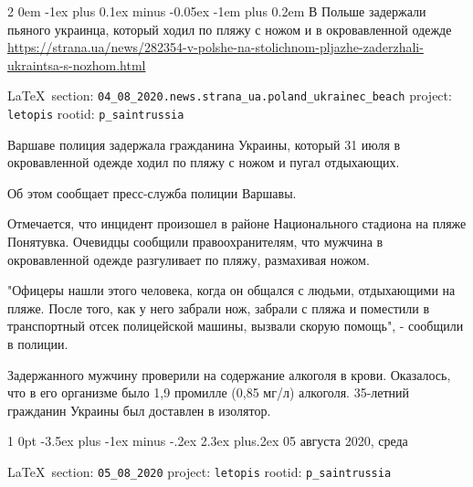 \documentclass[a4paper,11pt]{extreport}
\makeatletter
\renewcommand\section{%
  \clearpage
  \@startsection{section}%
    {1}%
    {0pt}%
    {-3.5ex plus -1ex minus -.2ex}%
    {2.3ex plus.2ex}%
    {\centering\normalfont\Huge\bfseries}%
}
\renewcommand\subsection{%
  \clearpage
    \@startsection{subsection}%
    {2}%
    {0em}%
    {-1ex plus 0.1ex minus -0.05ex}%
    {-1em plus 0.2em}%
    {\scshape\bfseries\Large}%
}
\makeatother
\begin{document}
 
\subsection{В Польше задержали пьяного украинца, который ходил по пляжу с ножом и в окровавленной одежде}
\label{sec:04_08_2020.news.strana_ua.poland_ukrainec_beach}
\url{https://strana.ua/news/282354-v-polshe-na-stolichnom-pljazhe-zaderzhali-ukraintsa-s-nozhom.html}
  
\vspace{0.5cm}
 {\ifDEBUG\small\LaTeX~section: \verb|04_08_2020.news.strana_ua.poland_ukrainec_beach| project: \verb|letopis| rootid: \verb|p_saintrussia| \fi}
\vspace{0.5cm}

Варшаве полиция задержала гражданина Украины, который 31 июля в окровавленной
одежде ходил по пляжу с ножом и пугал отдыхающих. 

Об этом сообщает пресс-служба полиции Варшавы.

Отмечается, что инцидент произошел в районе Национального стадиона на пляже
Понятувка. Очевидцы сообщили правоохранителям, что мужчина в окровавленной
одежде разгуливает по пляжу, размахивая ножом.

"Офицеры нашли этого человека, когда он общался с людьми, отдыхающими на пляже.
После того, как у него забрали нож, забрали с пляжа и поместили в транспортный
отсек полицейской машины, вызвали скорую помощь", - сообщили в полиции.

Задержанного мужчину проверили на содержание алкоголя в крови. Оказалось, что в
его организме было 1,9 промилле (0,85 мг/л) алкоголя. 35-летний гражданин
Украины был доставлен в изолятор.
  
 
 
\section{05 августа 2020, среда}
\label{sec:05_08_2020}
  
{\ifDEBUG\fi\small\LaTeX~section: \verb|05_08_2020| project: \verb|letopis| rootid: \verb|p_saintrussia|}
\end{document}
